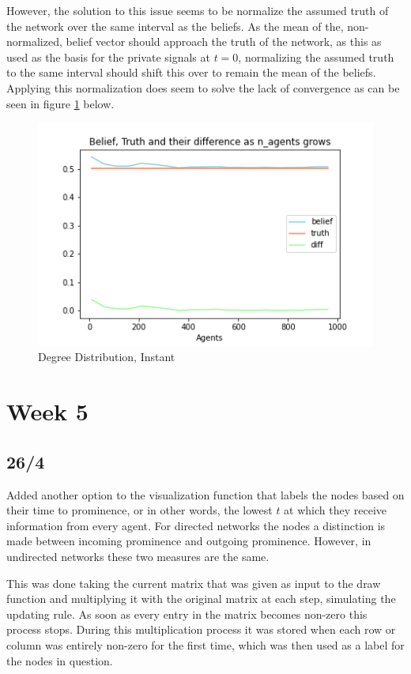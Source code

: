 \documentclass{article}
\begin{document}
However, the solution to this issue seems to be normalize the assumed truth of the network over the same interval as the beliefs. As the mean of the, non-normalized, belief vector should approach the truth of the network, as this as used as the basis for the private signals at $t=0$, normalizing the assumed truth to the same interval should shift this over to remain the mean of the beliefs. Applying this normalization does seem to solve the lack of convergence as can be seen in figure \ref{wisdom:norm} below.
\begin{center}
    \begin{figure}[!htbp]
        \centering
        \includegraphics[width=.7\textwidth]{ThesisKI/Images/WithNormalizedTruth.png}
        \caption{Degree Distribution, Instant}
        \label{wisdom:norm}
    \end{figure}
\end{center}

\newpage

\section{Week 5}

\subsection{26/4}

Added another option to the visualization function that labels the nodes based on their time to prominence, or in other words, the lowest $t$ at which they receive information from every agent. For directed networks the nodes a distinction is made between incoming prominence and outgoing prominence. However, in undirected networks these two measures are the same.

This was done taking the current matrix that was given as input to the draw function and multiplying it with the original matrix at each step, simulating the updating rule. As soon as every entry in the matrix becomes non-zero this process stops. During this multiplication process it was stored when each row or column was entirely non-zero for the first time, which was then used as a label for the nodes in question.
\end{document}
